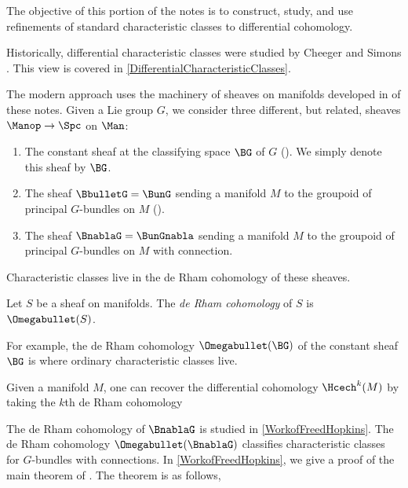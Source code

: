 \label{part:charclasses}\label{char_class_part}

The objective of this portion of the notes is to construct, study, and use refinements of standard characteristic classes to differential cohomology. 

Historically, differential characteristic classes were studied by Cheeger and Simons \cite{MR827262}. This view is covered in \cref{DifferentialCharacteristicClasses}.


The modern approach uses the machinery of sheaves on manifolds developed in  of these notes. 
Given a Lie group $G$, we consider three different, but related, sheaves $\Manop \to \Spc $ on $\Man$:
\begin{enumerate}[(1)]
	\item The constant sheaf at the classifying space $\BG$ of $ G $ ().
	We simply denote this sheaf by $ \BG $.

	\item The sheaf $ \BbulletG = \BunG $ sending a manifold $ M $ to the groupoid of principal $ G $-bundles on $ M $ ().

	\item The sheaf $ \BnablaG = \BunGnabla $ sending a manifold $ M $ to the groupoid of principal $ G $-bundles on $ M $ with connection.
\end{enumerate}%
Characteristic classes live in the de Rham cohomology of these sheaves. 

\begin{definition}
	Let $S$ be a sheaf on manifolds. 
	The \emph{de Rham cohomology} of $S$ is $\Omegabullet(S)$.
\end{definition}

\noindent For example, the de Rham cohomology $\Omegabullet(\BG)$ of the constant sheaf $\BG$ is where ordinary characteristic classes live.

\begin{remark}
	Given a manifold $M$, one can recover the differential cohomology $\Hcech^k(M)$ by taking the $k$th de Rham cohomology %
\end{remark}

The de Rham cohomology of $\BnablaG$ is studied in \cref{WorkofFreedHopkins}. The de Rham cohomology $\Omegabullet(\BnablaG)$ classifies characteristic classes for $G$-bundles with connections. In \cref{WorkofFreedHopkins}, we give a proof of the main theorem of \cite{FreedHopkins}. The theorem is as follows,

